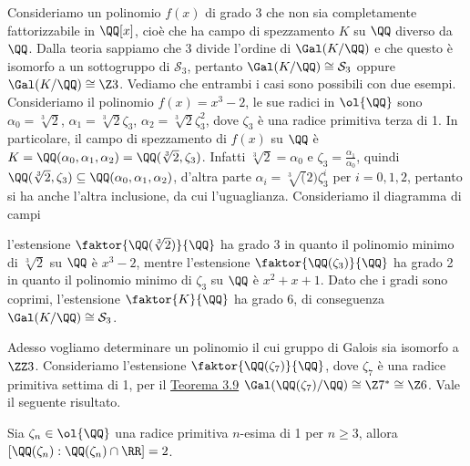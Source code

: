 \documentclass[11pt]{scrartcl}
\begin{document}
	Consideriamo un polinomio $f(x)$ di grado 3 che non sia completamente fattorizzabile 
	in $\QQ[x]$, cioè che ha campo di spezzamento $K$ 
	su $\QQ$ diverso da $\QQ$. Dalla teoria sappiamo che 3 divide l'ordine di 
	$\Gal(K/\QQ)$ e che questo è isomorfo a un sottogruppo di 
	$\mathcal{S}_3$, pertanto $\Gal(K/\QQ) \cong \mathcal{S}_3$ oppure $\Gal(K/\QQ) \cong \Z3$. 
	Vediamo che entrambi i casi sono possibili con due esempi.
	\newline
	Consideriamo il polinomio $f(x) = x^3 - 2$, le sue radici in $\ol{\QQ}$ sono 
	$\alpha_0 = \sqrt[3]{2}$, $\alpha_1 = \sqrt[3]2 \zeta_3$,
	$\alpha_2 = \sqrt[3]2\zeta_3^2$, dove $\zeta_3$ è una radice primitiva terza 
	di 1. In particolare, il campo di spezzamento di $f(x)$ su $\QQ$
	è $K = \QQ(\alpha_0, \alpha_1, \alpha_2) = \QQ(\sqrt[3]2, \zeta_3)$. Infatti 
	$\sqrt[3]2 = \alpha_0$ e $\zeta_3 = \frac{\alpha_1}{\alpha_0}$,
	quindi $\QQ(\sqrt[3]2, \zeta_3) \subseteq \QQ(\alpha_0, \alpha_1, \alpha_2)$, 
	d'altra parte $\alpha_i = \sqrt[3](2)\zeta_3^i$ per 
	$i = 0, 1, 2$, pertanto si ha anche l'altra inclusione, da cui l'uguaglianza. 
	Consideriamo il diagramma di campi 
	\begin{center}
	\end{center}
	l'estensione $\faktor{\QQ(\sqrt[3]2)}{\QQ}$ ha grado 3 in quanto il 
	polinomio minimo di $\sqrt[3]2$ su $\QQ$ è $x^3 - 2$, mentre 
	l'estensione $\faktor{\QQ(\zeta_3)}{\QQ}$ ha grado 2 in quanto il polinomio
	minimo di $\zeta_3$ su $\QQ$ è $x^2 + x + 1$. Dato 
	che i gradi sono coprimi, l'estensione $\faktor{K}{\QQ}$ ha grado 6, di 
	conseguenza $\Gal(K/\QQ) \cong \mathcal{S}_3$.
	\newline
	
	Adesso vogliamo determinare un polinomio il cui gruppo di Galois sia 
	isomorfo a $\ZZ3$. Consideriamo l'estensione $\faktor{\QQ(\zeta_7)}{\QQ}$,
	dove $\zeta_7$ è una radice primitiva settima di 1, per il 
	\hyperref[teorema3.9]{Teorema 3.9} $\Gal(\QQ(\zeta_7)/\QQ) \cong \Z7^* \cong \Z6$.
	Vale il seguente risultato.
	
	\begin{proposition}
		Sia $\zeta_n \in \ol{\QQ}$ una radice primitiva $n$-esima di 1 per $n \geq 3$,
		allora $[\QQ(\zeta_n):\QQ(\zeta_n)\cap \RR] = 2$.
	\end{proposition}
	
\end{document}
